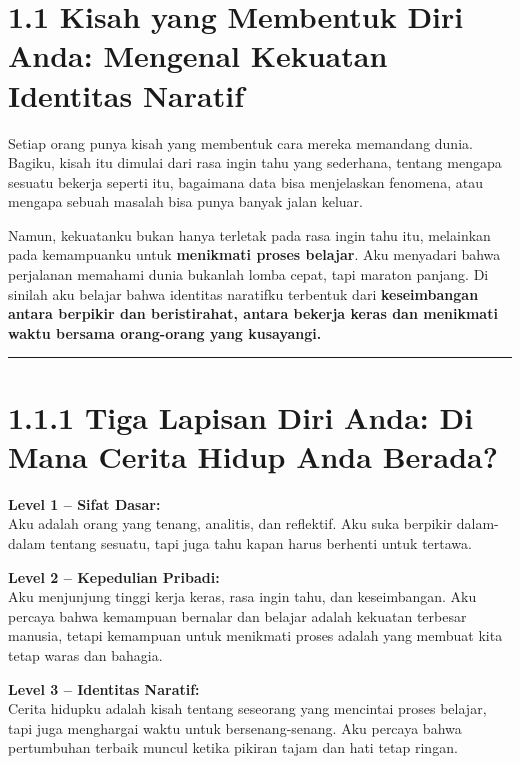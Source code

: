 \documentclass[
  letterpaper,
  DIV=11,
  numbers=noendperiod]{scrreprt}
\begin{document}
\section{1.1 Kisah yang Membentuk Diri Anda: Mengenal Kekuatan Identitas
Naratif}\label{kisah-yang-membentuk-diri-anda-mengenal-kekuatan-identitas-naratif}

Setiap orang punya kisah yang membentuk cara mereka memandang dunia.
Bagiku, kisah itu dimulai dari rasa ingin tahu yang sederhana, tentang
mengapa sesuatu bekerja seperti itu, bagaimana data bisa menjelaskan
fenomena, atau mengapa sebuah masalah bisa punya banyak jalan keluar.

Namun, kekuatanku bukan hanya terletak pada rasa ingin tahu itu,
melainkan pada kemampuanku untuk \textbf{menikmati proses belajar}. Aku
menyadari bahwa perjalanan memahami dunia bukanlah lomba cepat, tapi
maraton panjang. Di sinilah aku belajar bahwa identitas naratifku
terbentuk dari \textbf{keseimbangan antara berpikir dan beristirahat,
antara bekerja keras dan menikmati waktu bersama orang-orang yang
kusayangi.}

\begin{center}\rule{0.5\linewidth}{0.5pt}\end{center}

\section{1.1.1 Tiga Lapisan Diri Anda: Di Mana Cerita Hidup Anda
Berada?}\label{tiga-lapisan-diri-anda-di-mana-cerita-hidup-anda-berada}

\textbf{Level 1 -- Sifat Dasar:}\\
Aku adalah orang yang tenang, analitis, dan reflektif. Aku suka berpikir
dalam-dalam tentang sesuatu, tapi juga tahu kapan harus berhenti untuk
tertawa.

\textbf{Level 2 -- Kepedulian Pribadi:}\\
Aku menjunjung tinggi kerja keras, rasa ingin tahu, dan keseimbangan.
Aku percaya bahwa kemampuan bernalar dan belajar adalah kekuatan
terbesar manusia, tetapi kemampuan untuk menikmati proses adalah yang
membuat kita tetap waras dan bahagia.

\textbf{Level 3 -- Identitas Naratif:}\\
Cerita hidupku adalah kisah tentang seseorang yang mencintai proses
belajar, tapi juga menghargai waktu untuk bersenang-senang. Aku percaya
bahwa pertumbuhan terbaik muncul ketika pikiran tajam dan hati tetap
ringan.
\end{document}
